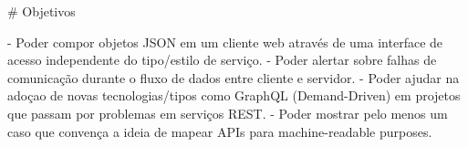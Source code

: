 # Objetivos

- Poder compor objetos JSON em um cliente web através de  uma interface de acesso independente do tipo/estilo de serviço.
- Poder alertar sobre falhas de comunicação durante o fluxo de dados entre cliente e servidor.
- Poder ajudar na adoçao de novas tecnologias/tipos como GraphQL (Demand-Driven) em projetos que passam por problemas em serviços REST.
- Poder mostrar pelo menos um caso que convença a ideia de mapear APIs para machine-readable purposes.
